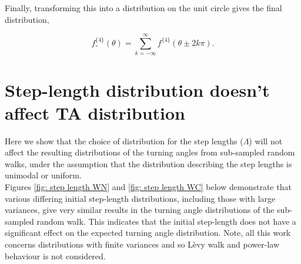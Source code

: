 \documentclass[english]{article}
\begin{document}
\begin{appendices}
Finally, transforming this into a distribution on the unit circle gives the final distribution,

\begin{equation}
   f^{\{4\}}_\circ(\theta)=\sum_{k=-\infty}^\infty f^{\{4\}}\left(\theta \pm 2k\pi\right). 
\end{equation}


\newpage

\section{Step-length distribution doesn't affect TA distribution}

Here we show that the choice of distribution for the step lengths ($\Lambda$) will not affect the resulting distributions of the turning angles from sub-sampled random walks, under the assumption that the distribution describing the step lengths is unimodal or uniform.\\

Figures \ref{fig: step length WN} and \ref{fig: step length WC} below demonstrate that various differing initial step-length distributions, including those with large variances, give very similar results in the turning angle distributions of the sub-sampled random walk.  This indicates that the initial step-length does not have a significant effect on the expected turning angle distribution.  Note, all this work concerns distributions with finite variances and so L\`{e}vy walk and power-law behaviour is not considered.


\end{appendices}
\end{document}
